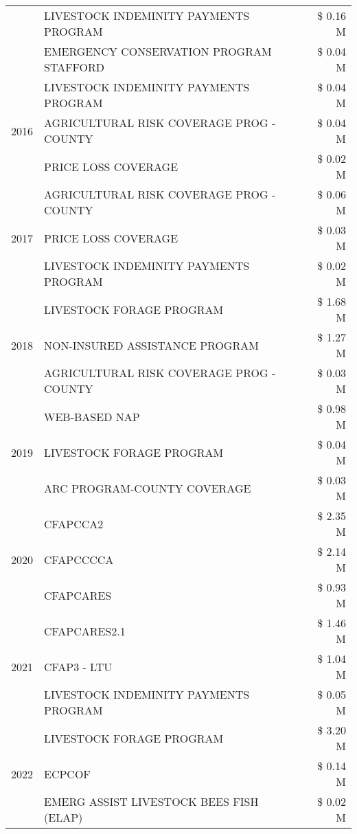 \begin{tabular}{llr}
 & LIVESTOCK INDEMINITY PAYMENTS PROGRAM & \$ 0.16 M \\
 & EMERGENCY CONSERVATION PROGRAM STAFFORD & \$ 0.04 M \\
\cline{1-3}
\multirow[t]{3}{*}{2016} & LIVESTOCK INDEMINITY PAYMENTS PROGRAM & \$ 0.04 M \\
 & AGRICULTURAL RISK COVERAGE PROG - COUNTY & \$ 0.04 M \\
 & PRICE LOSS COVERAGE & \$ 0.02 M \\
\cline{1-3}
\multirow[t]{3}{*}{2017} & AGRICULTURAL RISK COVERAGE PROG - COUNTY & \$ 0.06 M \\
 & PRICE LOSS COVERAGE & \$ 0.03 M \\
 & LIVESTOCK INDEMINITY PAYMENTS PROGRAM & \$ 0.02 M \\
\cline{1-3}
\multirow[t]{3}{*}{2018} & LIVESTOCK FORAGE PROGRAM & \$ 1.68 M \\
 & NON-INSURED ASSISTANCE PROGRAM & \$ 1.27 M \\
 & AGRICULTURAL RISK COVERAGE PROG - COUNTY & \$ 0.03 M \\
\cline{1-3}
\multirow[t]{3}{*}{2019} & WEB-BASED NAP & \$ 0.98 M \\
 & LIVESTOCK FORAGE PROGRAM & \$ 0.04 M \\
 & ARC PROGRAM-COUNTY COVERAGE & \$ 0.03 M \\
\cline{1-3}
\multirow[t]{3}{*}{2020} & CFAPCCA2 & \$ 2.35 M \\
 & CFAPCCCCA & \$ 2.14 M \\
 & CFAPCARES & \$ 0.93 M \\
\cline{1-3}
\multirow[t]{3}{*}{2021} & CFAPCARES2.1 & \$ 1.46 M \\
 & CFAP3 - LTU & \$ 1.04 M \\
 & LIVESTOCK INDEMINITY PAYMENTS PROGRAM & \$ 0.05 M \\
\cline{1-3}
\multirow[t]{3}{*}{2022} & LIVESTOCK FORAGE PROGRAM & \$ 3.20 M \\
 & ECPCOF & \$ 0.14 M \\
 & EMERG ASSIST LIVESTOCK BEES FISH (ELAP) & \$ 0.02 M \\
\cline{1-3}
\bottomrule
\end{tabular}
